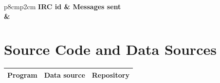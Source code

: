 \documentclass[a4wide,11pt]{report}
\begin{document}
\begin{tabular}{p{8cm}p{2cm}}
    \bfseries IRC id & \bfseries Messages sent %
    \csvreader[head to column names]{data/irc_top_senders.csv}{}%
    {\\\senders & \sent}
\end{tabular}

\appendix{}

\chapter{Source Code and Data Sources}
\label{chap:data_sources}

\begin{center}
\begin{longtable}{|p{4cm}|p{1cm}|p{10cm}|} 
\hline
Program & Data source & Repository \\
\hline


\end{longtable}
\end{center}
\end{document}
